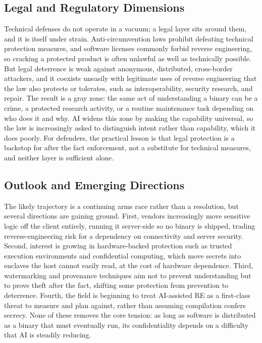 \documentclass[conference]{IEEEtran}
\begin{document}
\subsection{Legal and Regulatory Dimensions}
Technical defenses do not operate in a vacuum; a legal layer sits around them, and it
is itself under strain. Anti-circumvention laws prohibit defeating technical
protection measures, and software licenses commonly forbid reverse engineering, so
cracking a protected product is often unlawful as well as technically possible. But
legal deterrence is weak against anonymous, distributed, cross-border attackers, and
it coexists uneasily with legitimate uses of reverse engineering that the law also
protects or tolerates, such as interoperability, security research, and repair. The
result is a gray zone: the same act of understanding a binary can be a crime, a
protected research activity, or a routine maintenance task depending on who does it
and why. AI widens this zone by making the capability universal, so the law is
increasingly asked to distinguish intent rather than capability, which it does
poorly. For defenders, the practical lesson is that legal protection is a backstop
for after the fact enforcement, not a substitute for technical measures, and neither
layer is sufficient alone.

\subsection{Outlook and Emerging Directions}
The likely trajectory is a continuing arms race rather than a resolution, but several
directions are gaining ground. First, vendors increasingly move sensitive logic off
the client entirely, running it server-side so no binary is shipped, trading
reverse-engineering risk for a dependency on connectivity and server security.
Second, interest is growing in hardware-backed protection such as trusted execution
environments and confidential computing, which move secrets into enclaves the host
cannot easily read, at the cost of hardware dependence. Third, watermarking and
provenance techniques aim not to prevent understanding but to prove theft after the
fact, shifting some protection from prevention to deterrence. Fourth, the field is
beginning to treat AI-assisted RE as a first-class threat to measure and plan
against, rather than assuming compilation confers secrecy. None of these removes the
core tension: as long as software is distributed as a binary that must eventually
run, its confidentiality depends on a difficulty that AI is steadily reducing.
\end{document}
